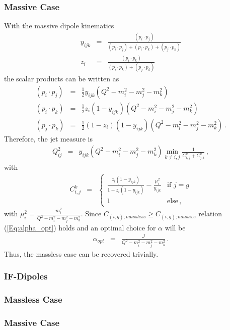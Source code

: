 \documentclass[a4paper,10pt]{scrartcl}
\begin{document}
\subsubsection*{Massive Case}

With the massive dipole kinematics
\begin{eqnarray}
 y_{ijk}
& = & \frac{(p_i\cdot p_j)}{(p_i\cdot p_j)+(p_i\cdot p_k)+(p_j\cdot p_k)} \\
 z_{i}
& = & \frac{(p_i\cdot p_k)}{(p_i\cdot p_k)+(p_j\cdot p_k)}
\end{eqnarray}
the scalar products can be written as
\begin{eqnarray}
 (p_i\cdot p_j)
& = & \tfrac{1}{2} y_{ijk} (Q^2 - m_i^2 - m_j^2 - m_k^2) \\
 (p_i\cdot p_k)
& = & \tfrac{1}{2} z_i(1-y_{ijk}) (Q^2 - m_i^2 - m_j^2 - m_k^2) \\
 (p_j\cdot p_k)
& = & \tfrac{1}{2} (1-z_i)(1-y_{ijk}) (Q^2 - m_i^2 - m_j^2 - m_k^2) \,.
\end{eqnarray}
Therefore, the jet measure is
\begin{eqnarray}
 Q_{ij}^2
& = & y_{ijk} (Q^2 - m_i^2 - m_j^2 - m_k^2) \min\limits_{k\neq i,j}\frac{1}{C_{i,j}^k+C_{j,i}^k} \,,
\end{eqnarray}
with
\begin{eqnarray}
 C_{i,j}^k
& = & \left\{\begin{array}{cc}
              \frac{z_i(1-y_{ijk})}{1-z_i(1-y_{ijk})} 
               - \frac{\mu_i^2}{y_{ijk}} & \mbox{if } j=g \\ 
               1 & \mbox{else}\,,
              \end{array}\right.
\end{eqnarray}
with $\mu_i^2=\frac{m_i^2}{Q^2-m_i^2-m_j^2-m_k^2}$.
Since $C_{(i,g);massless} \ge C_{(i,g);massive}$ relation (\ref{Eq:alpha_opt})
holds and an optimal choice for $\alpha$ will be
\begin{eqnarray}
 \alpha_{opt} & = & \frac{J}{Q^2-m_i^2-m_j^2-m_k^2} \,.
\end{eqnarray}
Thus, the massless case can be recovered trivially.

\subsubsection{IF-Dipoles}
\subsubsection*{Massless Case}
\subsubsection*{Massive Case}
\end{document}
